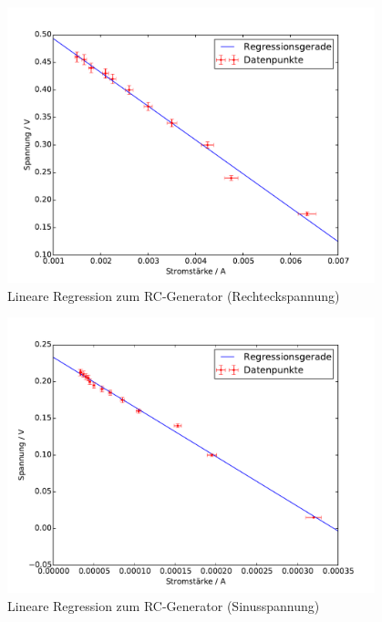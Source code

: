 \begin{figure}[h!]
	\centering
	\includegraphics[width=0.95\textwidth]{Spannung_Messung_d.pdf}
	\caption{Lineare Regression zum RC-Generator (Rechteckspannung)}
	\label{fig:L_kleiner_Druck}
\end{figure}

\begin{figure}[h!]
	\centering
	\includegraphics[width=0.95\textwidth]{Spannung_Messung_e.pdf}
	\caption{Lineare Regression zum RC-Generator (Sinusspannung)}
	\label{fig:L_kleiner_Druck}
\end{figure}

\clearpage

